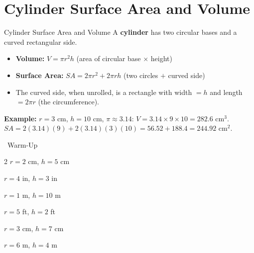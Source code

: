 \section{Cylinder Surface Area and Volume}

\begin{quickReview}{Cylinder Surface Area and Volume}
A \textbf{cylinder} has two circular bases and a curved rectangular side.

\begin{itemize}[leftmargin=*]
    \item \textbf{Volume:} $V = \pi r^2 h$ \quad (area of circular base $\times$ height)
    \item \textbf{Surface Area:} $SA = 2\pi r^2 + 2\pi r h$ \quad (two circles $+$ curved side)
    \item The curved side, when unrolled, is a rectangle with width $= h$ and length $= 2\pi r$ (the circumference).
\end{itemize}

\medskip
\textbf{Example:} $r = 3$ cm, $h = 10$ cm, $\pi \approx 3.14$:
$V = 3.14 \times 9 \times 10 = 282.6$ cm$^3$. \quad $SA = 2(3.14)(9) + 2(3.14)(3)(10) = 56.52 + 188.4 = 244.92$ cm$^2$.
\end{quickReview}

\begin{practiceBox}[funGreen]{\faSun~Warm-Up}


\begin{multicols}{2}
\prob $r = 2$ cm, $h = 5$ cm \answerBlank[3cm]

\prob $r = 4$ in, $h = 3$ in \answerBlank[3cm]

\prob $r = 1$ m, $h = 10$ m \answerBlank[3cm]

\prob $r = 5$ ft, $h = 2$ ft \answerBlank[3cm]

\prob $r = 3$ cm, $h = 7$ cm \answerBlank[3cm]

\prob $r = 6$ m, $h = 4$ m \answerBlank[3cm]
\end{multicols}
\end{practiceBox}


